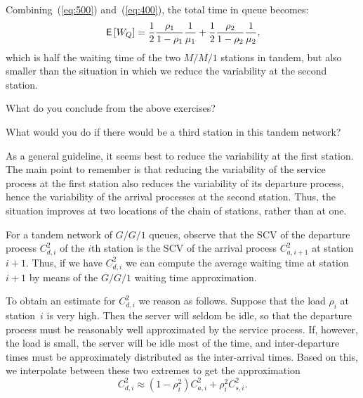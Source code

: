 \begin{exercise}
\begin{solution}
Combining~(\ref{eq:500}) and~(\ref{eq:400}), the total time in queue becomes:
\begin{equation*}
  \,\mathsf{E}\left[W_Q\right]= \frac12\frac{\rho_1}{1-\rho_1} \frac1{\mu_1} +
  \frac12\frac{\rho_2}{1-\rho_2} \frac1{\mu_2}, 
\end{equation*}
which is half the waiting time of the two $M/M/1$ stations in tandem, but also smaller than the situation in which we reduce the variability at the second station.
  \end{solution}
\end{exercise}

\begin{exercise}
  What do you conclude from the above exercises?
  \begin{hint}
    What would you do if there would be a third station in this tandem network?
  \end{hint}
  \begin{solution}
As a general guideline, it seems best to reduce the
variability at the first station. The main point to remember is that
reducing the variability of the service process at the first station
also reduces the variability of its departure process, hence the
variability of the arrival processes at the second station. Thus, the
situation improves at two locations of the chain of stations, rather
than at one.
  \end{solution}
\end{exercise}

For a tandem network of $G/G/1$ queues, observe that the SCV of the departure process $C_{d,i}^2$ of the $i$th station is the SCV of the arrival process $C_{a,i+1}^2$ at station $i+1$.  Thus, if we have $C_{d,i}^2$ we can compute the average waiting time at station~$i+1$ by means of the $G/G/1$ waiting time approximation. 

To obtain an estimate for $C_{d,i}^2$ we reason as follows.
Suppose that the load $\rho_i$ at station~$i$ is very high.
Then the server will seldom be idle, so that the departure process must be reasonably well approximated by the service process.
If, however, the load is small, the server will be idle most of the time, and inter-departure times must be approximately distributed as the inter-arrival times.
Based on this, we interpolate between these two extremes to get the approximation
\begin{equation}
  \label{eq:40}
  C_{d,i}^2 \approx (1-\rho_i^2) C_{a,i}^2 + \rho_i^2 C_{s,i}^2.
\end{equation}


